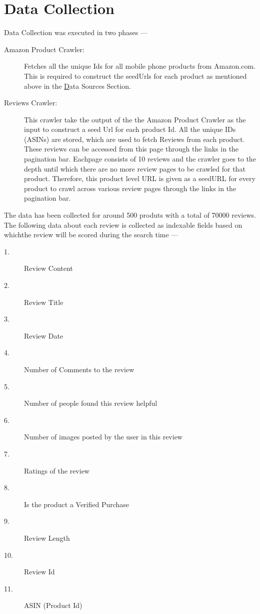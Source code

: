 \documentclass{article}
\begin{document}
\section{Data Collection}

Data Collection was executed in two phases ---

\begin{description}
	\item[Amazon Product Crawler: ] Fetches all the unique Ids for all mobile phone products from Amazon.com. This is required to construct the seedUrls for each product as mentioned above in the \hyperref[sec:dataSources] Data Sources Section.
	\item[Reviews Crawler: ] This crawler take the output of the the Amazon Product Crawler as the input to construct a seed Url for each product Id. All the unique IDs (ASINs) are stored, which are used to fetch Reviews from each product. These reviews can be accessed from this page through the links in the pagination bar. Eachpage consists of 10 reviews and the crawler goes to the depth until which there are no more review pages to be crawled for that product. Therefore, this product level URL is given as a seedURL for every product to crawl across various review pages through the links in the pagination bar.
\end{description}

The data has been collected for around 500 produts with a total of 70000 reviews. The following data about each review is collected as indexable fields based on whichthe review will be scored during the search time ---

\begin{description}
	\item[1. ] Review Content
	\item[2. ] Review Title
	\item[3. ] Review Date
	\item[4. ] Number of Comments to the review
	\item[5. ] Number of people found this review helpful
	\item[6. ] Number of images posted by the user in this review
	\item[7. ] Ratings of the review 
	\item[8. ] Is the product a Verified Purchase
	\item[9. ] Review Length
	\item[10. ] Review Id
	\item[11. ] ASIN (Product Id)
\end{description}
\end{document}
